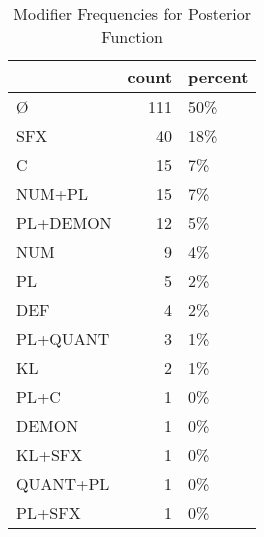 \begin{table}[htbp!]
\centering
\caption{Modifier Frequencies for Posterior Function}
\label{table:post_mod_cp}
\begin{tabular}{lrl}
\toprule
{} &  count & percent \\
\midrule
Ø        &    111 &     50\% \\
SFX      &     40 &     18\% \\
C        &     15 &      7\% \\
NUM+PL   &     15 &      7\% \\
PL+DEMON &     12 &      5\% \\
NUM      &      9 &      4\% \\
PL       &      5 &      2\% \\
DEF      &      4 &      2\% \\
PL+QUANT &      3 &      1\% \\
KL       &      2 &      1\% \\
PL+C     &      1 &      0\% \\
DEMON    &      1 &      0\% \\
KL+SFX   &      1 &      0\% \\
QUANT+PL &      1 &      0\% \\
PL+SFX   &      1 &      0\% \\
\bottomrule
\end{tabular}
\end{table}
